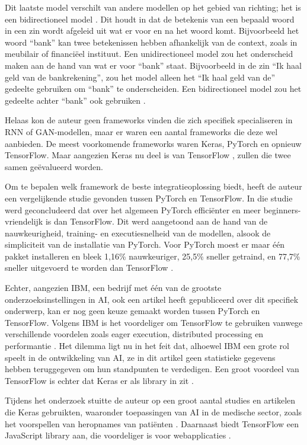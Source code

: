 \documentclass[dutch]{hogent-article}
\begin{document}
Dit laatste model verschilt van andere modellen op het gebied van richting; het is een bidirectioneel model \autocite{Devlin2018}. Dit houdt in dat de betekenis van een bepaald woord in een zin wordt afgeleid uit wat er voor en na het woord komt. Bijvoorbeeld het woord “bank” kan twee betekenissen hebben afhankelijk van de context, zoals in meubilair of financiëel instituut. Een unidirectioneel model zou het onderscheid maken aan de hand van wat er voor “bank” staat. Bijvoorbeeld in de zin “Ik haal geld van de bankrekening”, zou het model alleen het “Ik haal geld van de” gedeelte gebruiken om “bank” te onderscheiden. Een bidirectioneel model zou het gedeelte achter “bank” ook gebruiken \autocite{Devlin2018}.

Helaas kon de auteur geen frameworks vinden die zich specifiek specialiseren in RNN of GAN-modellen, maar er waren een aantal frameworks die deze wel aanbieden. De meest voorkomende frameworks waren Keras, PyTorch en opnieuw TensorFlow. Maar aangezien Keras nu deel is van TensorFlow \autocite{TensorFlow2023}, zullen die twee samen geëvalueerd worden.

Om te bepalen welk framework de beste integratieoplossing biedt, heeft de auteur een vergelijkende studie gevonden tussen PyTorch en TensorFlow. In die studie werd geconcludeerd dat over het algemeen PyTorch efficiënter en meer beginners-vriendelijk is dan TensorFlow. Dit werd aangetoond aan de hand van de nauwkeurigheid, training- en executiesnelheid van de modellen, alsook de simpliciteit van de installatie van PyTorch. Voor PyTorch moest er maar één pakket installeren en bleek 1,16\% nauwkeuriger, 25,5\% sneller getraind, en 77,7\% sneller uitgevoerd te worden dan TensorFlow \autocite{Novac2022AnalysisOT}.

Echter, aangezien IBM, een bedrijf met één van de grootste onderzoeksinstellingen in AI, ook een artikel heeft gepubliceerd over dit specifiek onderwerp, kan er nog geen keuze gemaakt worden tussen PyTorch en TensorFlow. Volgens IBM is het voordeliger om TensorFlow te gebruiken vanwege verschillende voordelen zoals eager execution, distributed processing en performantie \autocite{Madhavan2021}. Het dilemma ligt nu in het feit dat, alhoewel IBM een grote rol speelt in de ontwikkeling van AI, ze in dit artikel geen statistieke gegevens hebben teruggegeven om hun standpunten te verdedigen. Een groot voordeel van TensorFlow is echter dat Keras er als library in zit \autocite{Novac2022AnalysisOT}. 

Tijdens het onderzoek stuitte de auteur op een groot aantal studies en artikelen die Keras gebruikten, waaronder toepassingen van AI in de medische sector, zoals het voorspellen van heropnames van patiënten \autocite{Anshik2021}. Daarnaast biedt TensorFlow een JavaScript library aan, die voordeliger is voor webapplicaties \autocite{TensorFlowJS2015}.
\end{document}
